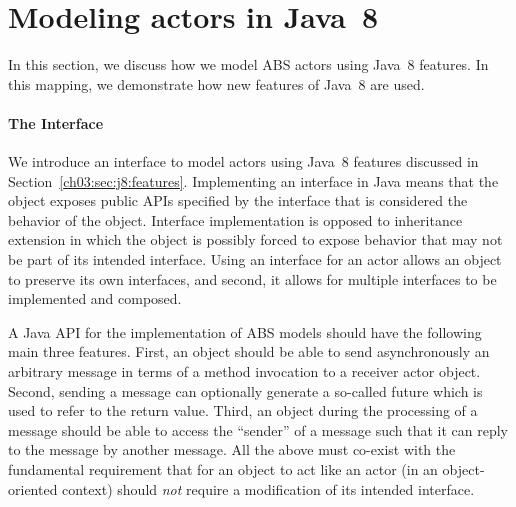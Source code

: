 \section{Modeling actors in Java~8}
\label{ch03:sec:j8:actors:realization}

In this section, we discuss how we model ABS actors  using Java~8 features.
In this mapping, we demonstrate how new features of Java~8 are used.

\paragraph{The  Interface}
We introduce an interface to model actors  using Java~8 features discussed in Section~\ref{ch03:sec:j8:features}.
Implementing an interface in Java means that the object exposes public APIs specified by the interface that is considered the behavior of the object.
Interface implementation is opposed to inheritance extension in which the object is 
possibly forced to expose behavior that may not be part of its intended interface.  
Using an interface for an actor  allows an object to preserve its own interfaces, and second, 
it allows for multiple interfaces to be implemented and composed.

A Java API for the implementation of ABS models should have the following main three  features.
First, an object should be able to send asynchronously an arbitrary message in terms of a method invocation to a receiver actor object.
Second, sending a message can optionally generate a so-called future which is used to refer to the return value.
Third, an object during the processing of a message should be able to access the ``sender'' of a message such that it can reply to the message by another message.
All the above must co-exist with the 
fundamental requirement that for an object to act like an actor (in an object-oriented context)
should \emph{not} require a modification of its intended interface.

